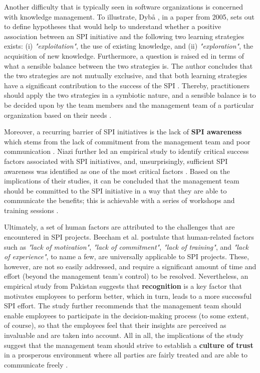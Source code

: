 \documentclass[conference]{IEEEtran}
\begin{document}
Another difficulty that is typically seen in software organizations is concerned
with knowledge management. To illustrate, Dybå \cite{Dyba2005}, in a paper from
2005, sets out to define hypotheses that would help to understand whether
a positive association between an SPI initiative and the following two learning
strategies exists: (i) \textit{"exploitation"}, the use of existing knowledge,
and (ii) \textit{"exploration"}, the acquisition of new knowledge. Furthermore,
a question is raised ed in terms of what a sensible balance between the two
strategies is. The author concludes that the two strategies are not mutually
exclusive, and that both learning strategies have a significant contribution to
the success of the SPI \cite{Dyba2005}. Thereby, practitioners should apply the
two strategies in a symbiotic nature, and a sensible balance is to be decided
upon by the  team members and the management team of a particular organization
based on their needs \cite{Dyba2005}.

Moreover, a recurring barrier of SPI initiatives is the lack of \textbf{SPI
awareness} which stems from the lack of commitment from the management team
and poor communication \cite{Niazi2010}. Niazi further led an empirical study 
to identify critical success factors associated with SPI initiatives, and,
unsurprisingly, sufficient SPI awareness was identified as one of the most
critical factors \cite{Niazi2006}. Based on the implications of their studies,
it can be concluded that the management team should be committed to the SPI
initiative in a way that they are able to communicate the benefits; this is
achievable with a series of workshops and training sessions \cite{Niazi2006}.

Ultimately, a set of human factors are attributed to the challenges that are
encountered in SPI projects. Beecham et al. \cite{Beecham2003}
postulate that human-related factors such as \textit{"lack of motivation"},
\textit{"lack of commitment"}, \textit{"lack of training"}, and \textit{"lack
of experience"}, to name a few, are universally applicable to SPI projects.
These, however, are not so easily addressed, and require a significant amount
of time and effort (beyond the management team's control) to be resolved.
Nevertheless, an empirical study from Pakistan \cite{Danish2010} suggests that
\textbf{recognition} is a key factor that motivates employees to perform better,
which in turn, leads to a more successful SPI effort. The study further
recommends that the management team should enable employees to participate in
the decision-making process (to some extent, of course), so that the employees
feel that their insights are perceived as invaluable and are taken into
account. All in all, the implications of the study suggest that the management
team should strive to establish a \textbf{culture of trust} in a prosperous
environment where all parties are fairly treated and are able to communicate
freely \cite{Danish2010}.
\end{document}

